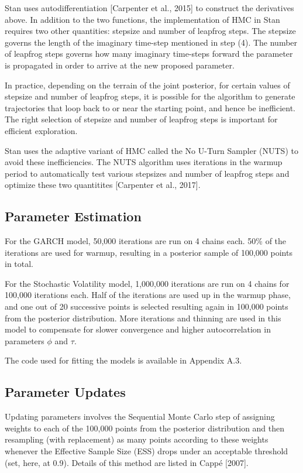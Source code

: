 \documentclass[12pt,letterpaper,reqno,fleqn]{article}
\begin{document}
Stan uses autodifferentiation [Carpenter et al., 2015] to construct the derivatives above. In addition to the two functions, the implementation of HMC in Stan requires two other quantities: stepsize and number of leapfrog steps. The stepsize governs the length of the imaginary time-step mentioned in step (4). The number of leapfrog steps governs how many imaginary time-steps forward the parameter is propagated in order to arrive at the new proposed parameter. 

In practice, depending on the terrain of the joint posterior, for certain values of stepsize and number of leapfrog steps, it is possible for the algorithm to generate trajectories that loop back to or near the starting point, and hence be inefficient. The right selection of stepsize and number of leapfrog steps is important for efficient exploration.

Stan uses the adaptive variant of HMC called the No U-Turn Sampler (NUTS) to avoid these inefficiencies. The NUTS algorithm uses iterations in the warmup period to automatically test various stepsizes and number of leapfrog steps and optimize these two quantitites [Carpenter et al., 2017].  

\subsection{Parameter Estimation}
For the GARCH model, 50,000 iterations are run on 4 chains each. 50\% of the iterations are used for warmup, resulting in a posterior sample of 100,000 points in total.  

For the Stochastic Volatility model, 1,000,000 iterations are run on 4 chains for 100,000 iterations each. Half of the iterations are used up in the warmup phase, and one out of 20 successive points is selected resulting again in 100,000 points from the posterior distribution. More iterations and thinning are used in this model to compensate for slower convergence and higher autocorrelation in parameters $\phi$ and $\tau$. 

The code used for fitting the models is available in Appendix A.3.

\subsection{Parameter Updates}
Updating parameters involves the Sequential Monte Carlo step of assigning weights to each of the 100,000 points from the posterior distribution and then resampling (with replacement) as many points according to these weights whenever the Effective Sample Size (ESS) drops under an acceptable threshold (set, here, at 0.9). Details of this method are listed in Capp\'{e} [2007].
\end{document}
